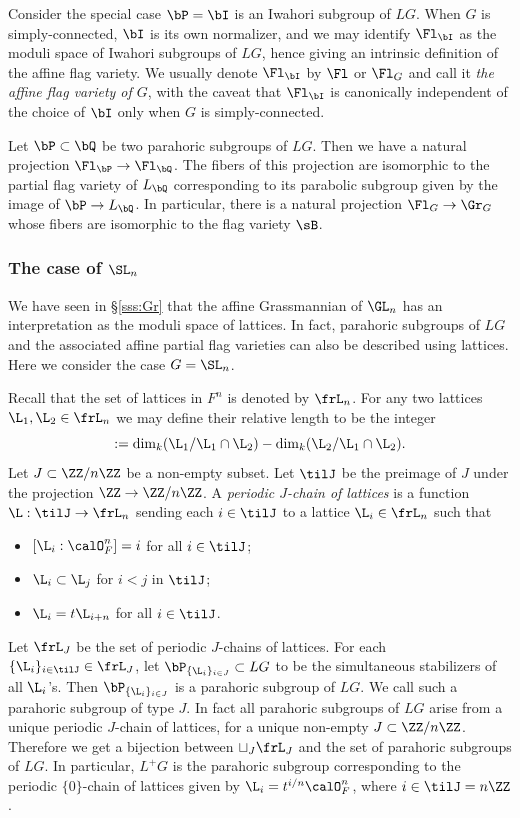 Consider the special case $\bP=\bI$ is an Iwahori subgroup of $LG$. When $G$ is simply-connected, $\bI$ is its own normalizer, and we may identify $\Fl_{\bI}$ as the moduli space of Iwahori subgroups of $LG$, hence giving an intrinsic definition of the affine flag variety. We usually denote $\Fl_{\bI}$ by $\Fl$ or $\Fl_{G}$ and call it {\em the affine flag variety of $G$}, with the caveat that $\Fl_{\bI}$ is canonically independent of the choice of $\bI$ only when $G$ is simply-connected.

Let $\bP\subset\bQ$ be two parahoric subgroups of $LG$. Then we have a natural projection $\Fl_{\bP}\to \Fl_{\bQ}$. The fibers of this projection are isomorphic to the partial flag variety of $L_{\bQ}$ corresponding to its parabolic subgroup given by the image of $\bP\to L_{\bQ}$. In particular, there is a natural projection $\Fl_{G}\to \Gr_{G}$ whose fibers are isomorphic to the flag variety $\sB$.


\subsubsection{The case of $\SL_{n}$}\label{sss:GLn parahoric} We have seen in \S\ref{sss:Gr} that the affine Grassmannian of $\GL_{n}$ has an interpretation as the moduli space of lattices. In fact, parahoric subgroups of $LG$ and the associated affine partial flag varieties can also be described using lattices. Here we consider the case $G=\SL_{n}$.  

Recall that the set of lattices in $F^{n}$ is denoted by $\frL_{n}$. For any two lattices $\L_{1},\L_{2}\in\frL_{n}$ we may define their relative length to be the integer
\begin{equation*}
[\L_{1}:\L_{2}]:=\dim_{k}(\L_{1}/\L_{1}\cap\L_{2})-\dim_{k}(\L_{2}/\L_{1}\cap\L_{2}).
\end{equation*}
Let $J\subset \ZZ/n\ZZ$ be a non-empty subset. Let $\tilJ$ be the preimage of $J$ under the projection  $\ZZ\to\ZZ/n\ZZ$. A {\em periodic $J$-chain of lattices} is a function $\L:\tilJ\to \frL_{n}$ sending each $i\in \tilJ$ to a lattice $\L_{i}\in\frL_{n}$ such that
\begin{itemize}
\item $[\L_{i}:\calO_{F}^{n}]=i$  for all $i\in \tilJ$;
\item $\L_{i}\subset \L_{j}$ for $i<j$ in $\tilJ$;
\item $\L_{i}=t\L_{i+n}$ for all $i\in \tilJ$.
\end{itemize}
Let $\frL_{J}$ be the set of periodic $J$-chains of lattices. For each $\{\L_{i}\}_{i\in \tilJ}\in\frL_{J}$, let $\bP_{\{\L_{i}\}_{i\in J}}\subset LG$ to be the simultaneous stabilizers of all $\L_{i}$'s. Then $\bP_{\{\L_{i}\}_{i\in J}}$ is a parahoric subgroup of $LG$. We call such a parahoric subgroup of type $J$. In fact all parahoric subgroups of $LG$ arise from a unique periodic $J$-chain of lattices, for a unique non-empty $J\subset \ZZ/n\ZZ$.  Therefore we get a bijection between $\sqcup_{J}\frL_{J}$ and the set of parahoric subgroups of $LG$.  In particular, $L^{+}G$ is the parahoric subgroup corresponding to the periodic $\{0\}$-chain of lattices given by $\L_{i}=t^{i/n}\calO^{n}_{F}$, where $i\in \tilJ=n\ZZ$. 

